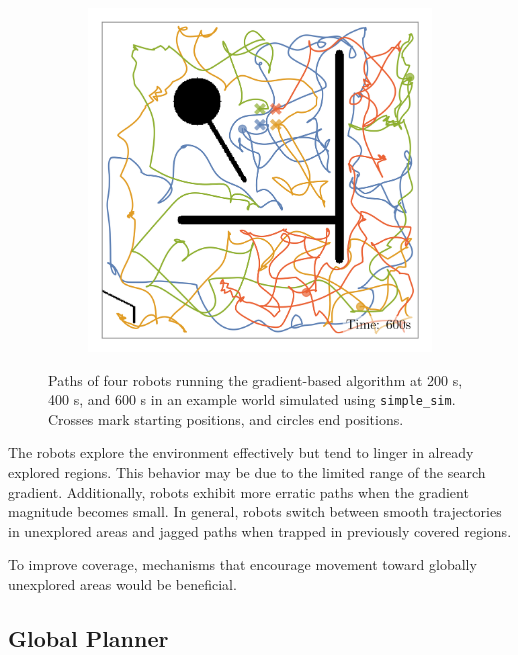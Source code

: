 \begin{figure}[H]
\begin{subfigure}[b]{\w}
    \end{subfigure}
    \begin{subfigure}[b]{\w}
        \centering
        \includegraphics[width=\textwidth]{./figures/plots/paths/search:gradient-paths-(after-600s).png}
    \end{subfigure}
    \caption{Paths of four robots running the gradient-based algorithm at 200 s, 400 s, and 600 s in an example
    world simulated using \texttt{simple\_sim}. Crosses mark starting positions, and circles end positions.}
    \label{fig:gradient-paths}
\end{figure}

The robots explore the environment effectively but tend to linger in already explored regions. This behavior may be due to the limited range of the search gradient. Additionally, robots exhibit more erratic paths when the gradient magnitude becomes small. In general, robots switch between smooth trajectories in unexplored areas and jagged paths when trapped in previously covered regions.


To improve coverage, mechanisms that encourage movement toward globally unexplored areas would be beneficial.

\subsection{Global Planner}

